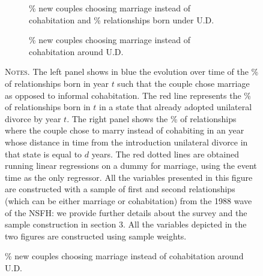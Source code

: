 \documentclass[12pt]{article}
\numberwithin{table}{section}
\begin{document}
\begin{figure}[ht]
	\begin{center}
		\caption{\\ Newly formed relationships (either married or cohabiting) and unilateral divorce (U.D.)}
		\label{fig:events_raw}
		
		\begin{subfigure}{.49\textwidth}
			\centering
			\caption{{\color{blue}\% new couples choosing marriage instead of cohabitation} and {\color{red}\% relationships born under U.D.} }
			
			\label{fig:years_raw}
			\scalebox{0.5}{ } 
		\end{subfigure}
		\begin{subfigure}{.49\textwidth}
			\centering
			\caption{\% new couples choosing marriage instead of cohabitation around U.D.}
			\label{fig:event_raw}
			\scalebox{0.5}{ } 
		\end{subfigure}

	\end{center}
	

	\begin{minipage}{0.99\textwidth} %
		{\footnotesize \textsc{Notes.} The left panel shows in blue the evolution over time of the \% of relationships born in year $t$ such that the couple chose marriage as opposed to informal cohabitation. The red line represents the \% of relationships born in $t$ in a state that already adopted unilateral divorce by year $t$. The right panel shows the \% of relationships where the couple chose to marry instead of cohabiting in an year whose distance in time from the introduction unilateral divorce in that state is equal to $d$ years. The red dotted lines are obtained running linear regressions on a dummy for marriage, using the event time as the only regressor. All the variables presented in this figure are constructed with a sample of first and second relationships (which can be either marriage or cohabitation) from the 1988 wave of the NSFH: we provide further details about the survey and the sample construction in section 3. All the variables depicted in the two figures are constructed using sample weights. \par}
	\end{minipage}
\end{figure}
\FloatBarrier
\end{document}
